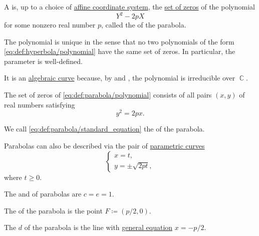 \begin{definition}\label{def:parabola}
  A  is, up to a choice of \hyperref[def:affine_coordinate_system]{affine coordinate system}, the \hyperref[def:root_of_polynomial]{set of zeros} of the polynomial
  \begin{equation}\label{eq:def:parabola/polynomial}
    Y^2 - 2p X
  \end{equation}
  for some nonzero real number \( p \), called the  of the parabola.

  The polynomial is unique in the sense that no two polynomials of the form \eqref{eq:def:hyperbola/polynomial} have the same set of zeros. In particular, the parameter is well-defined.

  It is an \hyperref[def:affine_algebraic_set/curve]{algebraic curve} because, by  and , the polynomial is irreducible over \( \BbbC \).

  \begin{thmenum}
     The set of zeros of \eqref{eq:def:parabola/polynomial} consists of all pairs \( (x, y) \) of real numbers satisfying
    \begin{equation}\label{eq:def:parabola/standard_equation}
      y^2 = 2px.
    \end{equation}

    We call \eqref{eq:def:parabola/standard_equation} the  of the parabola.

     Parabolas can also be described via the pair of \hyperref[def:parametric_curve]{parametric curves}
    \begin{equation}\label{eq:def:parabola/parametric_equation}
      \begin{cases}
        x = t, \\
        y = \pm \sqrt{ 2pt },
      \end{cases}
    \end{equation}
    where \( t \geq 0 \).

     The  and  of parabolas are \( c = e = 1 \).

     The  of the parabola is the point \( F \coloneqq (p / 2, 0) \).

     The  \( d \) of the parabola is the line with \hyperref[def:plane_line_equations/general]{general equation} \( x = -p / 2 \).


\end{thmenum}
\end{definition}
